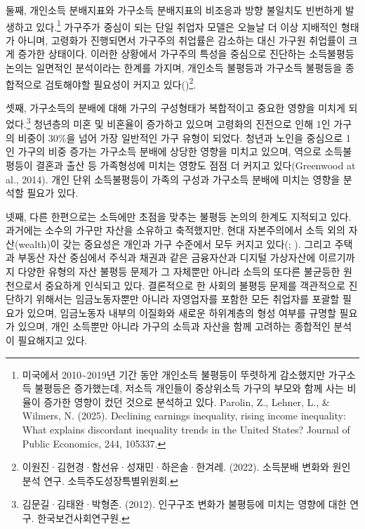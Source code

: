 \documentclass[
  letterpaper,
  DIV=11,
  numbers=noendperiod]{scrartcl}
\begin{document}
둘째, 개인소득 분배지표와 가구소득 분배지표의 비조응과 방향 불일치도
빈번하게 발생하고 있다.\footnote{미국에서 2010\textasciitilde2019년 기간
  동안 개인소득 불평등이 뚜렷하게 감소했지만 가구소득 불평등은
  증가했는데, 저소득 개인들이 중상위소득 가구의 부모와 함께 사는 비율이
  증가한 영향이 컸던 것으로 분석하고 있다. Parolin, Z., Lehner, L., \&
  Wilmers, N. (2025). Declining earnings inequality, rising income
  inequality: What explains discordant inequality trends in the United
  States? Journal of Public Economics, 244, 105337.} 가구주가 중심이
되는 단일 취업자 모델은 오늘날 더 이상 지배적인 형태가 아니며, 고령화가
진행되면서 가구주의 취업률은 감소하는 대신 가구원 취업률이 크게 증가한
상태이다. 이러한 상황에서 가구주의 특성을 중심으로 진단하는 소득불평등
논의는 일면적인 분석이라는 한계를 가지며, 개인소득 불평등과 가구소득
불평등을 종합적으로 검토해야할 필요성이 커지고
있다()\footnote{이원진·김현경·함선유·성재민·하은솔·한겨레.
  (2022). 소득분배 변화와 원인 분석 연구. 소득주도성장특별위원회.}.

셋째, 가구소득의 분배에 대해 가구의 구성형태가 복합적이고 중요한 영향을
미치게 되었다.\footnote{김문길·김태완·박형존. (2012). 인구구조 변화가
  불평등에 미치는 영향에 대한 연구. 한국보건사회연구원.} 청년층의 미혼
및 비혼율이 증가하고 있으며 고령화의 진전으로 인해 1인 가구의 비중이
30\%을 넘어 가장 일반적인 가구 유형이 되었다. 청년과 노인을 중심으로 1인
가구의 비중 증가는 가구소득 분배에 상당한 영향을 미치고 있으며, 역으로
소득불평등이 결혼과 출산 등 가족형성에 미치는 영향도 점점 더 커지고
있다(Greenwood at al., 2014). 개인 단위 소득불평등이 가족의 구성과
가구소득 분배에 미치는 영향을 분석할 필요가 있다.

넷째, 다른 한편으로는 소득에만 초점을 맞추는 불평등 논의의 한계도
지적되고 있다. 과거에는 소수의 가구만 자산을 소유하고 축적했지만, 현대
자본주의에서 소득 외의 자산(wealth)이 갖는 중요성은 개인과 가구 수준에서
모두 커지고
있다(; ).
그리고 주택과 부동산 자산 중심에서 주식과 채권과 같은 금융자산과 디지털
가상자산에 이르기까지 다양한 유형의 자산 불평등 문제가 그 자체뿐만
아니라 소득의 또다른 불균등한 원천으로서 중요하게 인식되고 있다.
결론적으로 한 사회의 불평등 문제를 객관적으로 진단하기 위해서는
임금노동자뿐만 아니라 자영업자를 포함한 모든 취업자를 포괄할 필요가
있으며, 임금노동자 내부의 이질화와 새로운 하위계층의 형성 여부를 규명할
필요가 있으며, 개인 소득뿐만 아니라 가구의 소득과 자산을 함께 고려하는
종합적인 분석이 필요해지고 있다.
\end{document}

